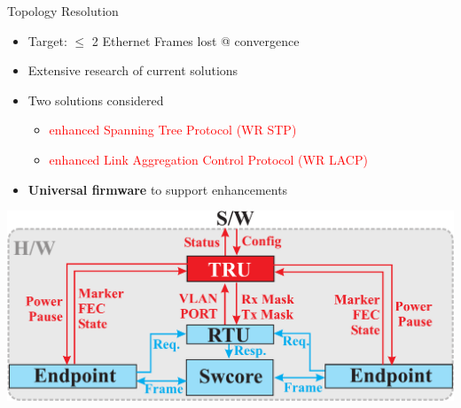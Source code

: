 \documentclass[compress,red]{beamer}
\begin{document}
\begin{frame}{Topology Resolution}

  \begin{itemize}
    \item Target: $\leq$ 2 Ethernet Frames lost @ convergence
    \item Extensive research of current solutions
    \item Two solutions considered
    \begin{itemize}
      \item \textcolor{red}{enhanced Spanning Tree Protocol (WR STP)}
      \item \textcolor{red}{enhanced Link Aggregation Control Protocol (WR LACP)}
    \end{itemize}
    \item {\bf Universal firmware} to support enhancements
  \end{itemize}

      \begin{center}
	\includegraphics[width=.9\textwidth]{robustness/TopologyResolutionUnit.pdf}
      \end{center}

\end{frame}
\end{document}
